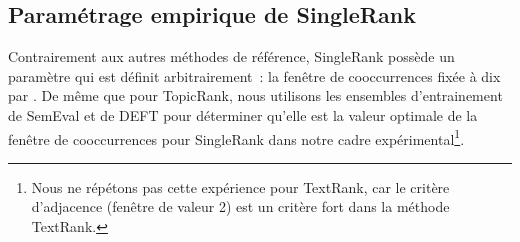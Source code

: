       \subsection{Paramétrage empirique de SingleRank}
      \label{subsec:main-automatic_keyphrase_annotation-unsupervised_automatic_keyphrase_extraction-evaluation-empirical_setting_of_singlerank}
        Contrairement aux autres méthodes de référence, SingleRank possède un
        paramètre qui est définit arbitrairement~: la fenêtre de cooccurrences
        fixée à dix par . De même que pour TopicRank,
        nous utilisons les ensembles d'entrainement de SemEval et de DEFT pour
        déterminer qu'elle est la valeur optimale de la fenêtre de cooccurrences
        pour SingleRank dans notre cadre expérimental\footnote{Nous ne répétons
        pas cette expérience pour TextRank, car le critère d'adjacence
        (fenêtre de valeur 2) est un critère fort dans la méthode TextRank.}.


